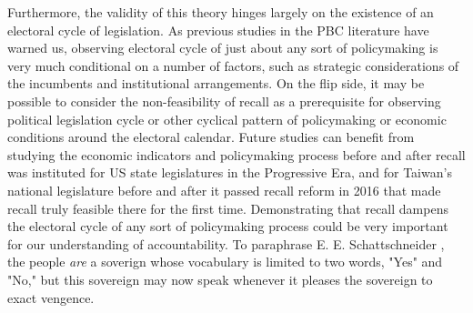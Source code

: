\documentclass{article}
\begin{document}
		Furthermore,
		the validity of this theory hinges largely on
		the existence of an electoral cycle of legislation.
		As previous studies in the PBC literature have warned us,
		observing electoral cycle of just about any sort of policymaking
		is very much conditional on a number of factors,
		such as strategic considerations of the incumbents
		and institutional arrangements.
		On the flip side,
		it may be possible to consider the non-feasibility of recall
		as a prerequisite for observing political legislation cycle
		or other cyclical pattern of policymaking or economic conditions
		around the electoral calendar.
		Future studies can benefit from studying
		the economic indicators and policymaking process
		before and after recall was instituted for US state legislatures
		in the Progressive Era,
		and for Taiwan's national legislature
		before and after it passed recall reform in 2016
		that made recall truly feasible there for the first time.
		Demonstrating that recall dampens the electoral cycle
		of any sort of policymaking process
		could be very important for our understanding of accountability.
		To paraphrase E. E. Schattschneider \autocite*[52]{schattschneiderPartyGovernmentAmerican2017},
		the people \textit{are} a soverign
		whose vocabulary is limited to two words, "Yes"
		and "No," but this sovereign may now speak
		whenever it pleases the sovereign to exact vengence.
		
		
		
		
		
\end{document}
